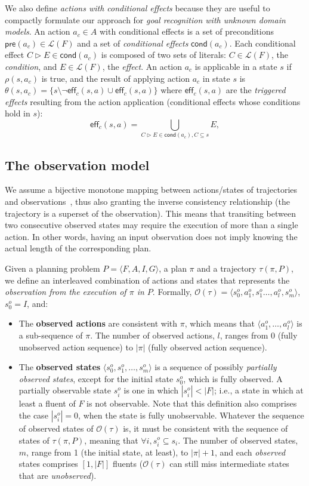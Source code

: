 \documentclass{article}
\newcommand{\tup}[1]{{\langle #1 \rangle}}
\newcommand{\pre}{\mathsf{pre}}     %
\newcommand{\eff}{\mathsf{eff}}     %
\newcommand{\cond}{\mathsf{cond}}   %
\begin{document}
We also define {\em actions with conditional effects} because they are useful to compactly formulate our approach for {\em goal recognition with unknown domain models}. An action $a_c\in A$ with conditional effects is a set of preconditions $\pre(a_c)\in\mathcal{L}(F)$ and a set of {\em conditional effects} $\cond(a_c)$. Each conditional effect $C\rhd E\in\cond(a_c)$ is composed of two sets of literals: $C\in\mathcal{L}(F)$, the {\em condition}, and $E\in\mathcal{L}(F)$, the {\em effect}. An action $a_c$ is applicable in a state $s$ if $\rho(s,a_c)$ is true, and the result of applying action $a_c$ in state $s$ is $\theta(s,a_c)=\{s\setminus\neg\eff_c(s,a)\cup\eff_c(s,a)\}$ where $\eff_c(s,a)$ are the {\em triggered effects} resulting from the action application (conditional effects whose conditions hold in $s$):
\[
\eff_c(s,a)=\bigcup_{C\rhd E\in\cond(a_c),C\subseteq s} E,
\]

\subsection{The observation model}
We assume a bijective monotone mapping between actions/states of trajectories and observations~\cite{ramirez2009plan}, thus also granting the inverse consistency relationship (the trajectory is a superset of the observation). This means that transiting between two consecutive observed states may require the execution of more than a single action. In other words, having an input observation does not imply knowing the actual length of the corresponding plan.

Given a planning problem $P=\tup{F,A,I,G}$, a plan $\pi$ and a trajectory $\tau(\pi,P)$, we define an interleaved combination of actions and states that represents the {\em observation from the execution of $\pi$ in $P$}. Formally, $\mathcal{O}(\tau)=\tup{s_0^o,a_1^o,s_1^o \ldots , a_l^o, s_m^o}$, $s_0^o=I$, and:
\begin{itemize}
\item The {\bf observed actions} are consistent with $\pi$, which means that $\tup{a_1^o, \ldots, a_l^o}$ is a sub-sequence of $\pi$. The number of observed actions, $l$, ranges from $0$ (fully unobserved action sequence) to $|\pi|$ (fully observed action sequence).
\item The {\bf observed states} $\tup{s_0^o, s_1^o, \ldots, s_m^o}$ is a sequence of possibly {\em partially observed states}, except for the initial state $s_0^o$, which is fully observed. A partially observable state $s_i^o$ is one in which $|s_i^o| < |F|$; i.e., a state in which at least a fluent of $F$ is not observable. Note that this definition also comprises the case $|s_i^o| = 0$, when the state is fully unobservable. Whatever the sequence of observed states of $\mathcal{O}(\tau)$ is, it must be consistent with the sequence of states of $\tau(\pi,P)$, meaning that $\forall i, s_i^o \subseteq s_i$. The number of observed states, $m$, range from 1 (the initial state, at least), to $|\pi|+1$, and each {\em observed} states comprises $[1,|F|]$ fluents ($\mathcal{O}(\tau)$ can still miss intermediate states that are {\em unobserved}).
\end{itemize}
\end{document}

